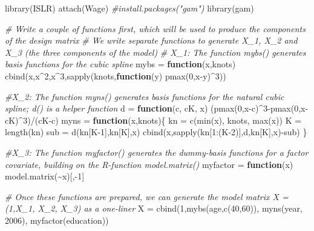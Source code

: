 \documentclass[
]{article}
\newenvironment{Shaded}{\begin{snugshade}}{\end{snugshade}}
\newcommand{\CommentTok}[1]{\textcolor[rgb]{0.56,0.35,0.01}{\textit{#1}}}
\newcommand{\ControlFlowTok}[1]{\textcolor[rgb]{0.13,0.29,0.53}{\textbf{#1}}}
\newcommand{\DecValTok}[1]{\textcolor[rgb]{0.00,0.00,0.81}{#1}}
\newcommand{\FunctionTok}[1]{\textcolor[rgb]{0.00,0.00,0.00}{#1}}
\newcommand{\NormalTok}[1]{#1}
\newcommand{\OtherTok}[1]{\textcolor[rgb]{0.56,0.35,0.01}{#1}}
\newcommand{\SpecialCharTok}[1]{\textcolor[rgb]{0.00,0.00,0.00}{#1}}
\begin{document}
\begin{Shaded}
\begin{Highlighting}[]
\FunctionTok{library}\NormalTok{(ISLR)}
\FunctionTok{attach}\NormalTok{(Wage)}
\CommentTok{\#install.packages("gam")}
\FunctionTok{library}\NormalTok{(gam)}

\CommentTok{\# Write a couple of functions first, which will be used to produce the components of the design matrix}
\CommentTok{\# We write separate functions to generate X\_1, X\_2 and X\_3 (the three components of the model)}
\CommentTok{\# X\_1: The function mybs() generates basis functions for the cubic spline}
\NormalTok{mybs }\OtherTok{=} \ControlFlowTok{function}\NormalTok{(x,knots) }\FunctionTok{cbind}\NormalTok{(x,x}\SpecialCharTok{\^{}}\DecValTok{2}\NormalTok{,x}\SpecialCharTok{\^{}}\DecValTok{3}\NormalTok{,}\FunctionTok{sapply}\NormalTok{(knots,}\ControlFlowTok{function}\NormalTok{(y) }\FunctionTok{pmax}\NormalTok{(}\DecValTok{0}\NormalTok{,x}\SpecialCharTok{{-}}\NormalTok{y)}\SpecialCharTok{\^{}}\DecValTok{3}\NormalTok{))}

\CommentTok{\#X\_2: The function myns() generates basis functions for the natural cubic spline; d() is a helper function}
\NormalTok{d }\OtherTok{=} \ControlFlowTok{function}\NormalTok{(c, cK, x) (}\FunctionTok{pmax}\NormalTok{(}\DecValTok{0}\NormalTok{,x}\SpecialCharTok{{-}}\NormalTok{c)}\SpecialCharTok{\^{}}\DecValTok{3}\SpecialCharTok{{-}}\FunctionTok{pmax}\NormalTok{(}\DecValTok{0}\NormalTok{,x}\SpecialCharTok{{-}}\NormalTok{cK)}\SpecialCharTok{\^{}}\DecValTok{3}\NormalTok{)}\SpecialCharTok{/}\NormalTok{(cK}\SpecialCharTok{{-}}\NormalTok{c)}
\NormalTok{myns }\OtherTok{=} \ControlFlowTok{function}\NormalTok{(x,knots)\{}
\NormalTok{  kn }\OtherTok{=} \FunctionTok{c}\NormalTok{(}\FunctionTok{min}\NormalTok{(x), knots, }\FunctionTok{max}\NormalTok{(x))}
\NormalTok{  K }\OtherTok{=} \FunctionTok{length}\NormalTok{(kn)}
\NormalTok{  sub }\OtherTok{=} \FunctionTok{d}\NormalTok{(kn[K}\DecValTok{{-}1}\NormalTok{],kn[K],x)}
  \FunctionTok{cbind}\NormalTok{(x,}\FunctionTok{sapply}\NormalTok{(kn[}\DecValTok{1}\SpecialCharTok{:}\NormalTok{(K}\DecValTok{{-}2}\NormalTok{)],d,kn[K],x)}\SpecialCharTok{{-}}\NormalTok{sub)}
\NormalTok{\}}

\CommentTok{\#X\_3: The function myfactor() generates the dummy{-}basis functions for a factor covariate, building on the R{-}function model.matrix()}
\NormalTok{myfactor }\OtherTok{=} \ControlFlowTok{function}\NormalTok{(x) }\FunctionTok{model.matrix}\NormalTok{(}\SpecialCharTok{\textasciitilde{}}\NormalTok{x)[,}\SpecialCharTok{{-}}\DecValTok{1}\NormalTok{]}

\CommentTok{\# Once these functions are prepared, we can generate the model matrix X = (1,X\_1, X\_2, X\_3) as a one{-}liner }
\NormalTok{X }\OtherTok{=} \FunctionTok{cbind}\NormalTok{(}\DecValTok{1}\NormalTok{,}\FunctionTok{mybs}\NormalTok{(age,}\FunctionTok{c}\NormalTok{(}\DecValTok{40}\NormalTok{,}\DecValTok{60}\NormalTok{)), }\FunctionTok{myns}\NormalTok{(year, }\DecValTok{2006}\NormalTok{), }\FunctionTok{myfactor}\NormalTok{(education))}
\end{Highlighting}
\end{Shaded}
\end{document}
